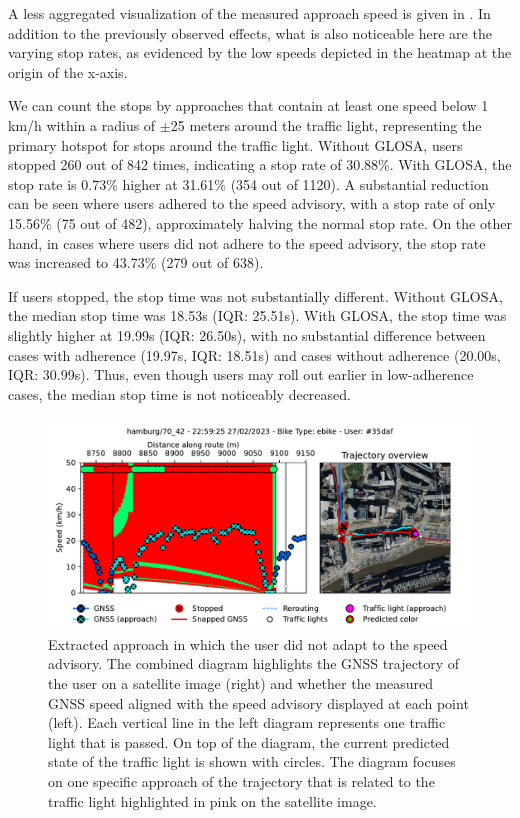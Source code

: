 A less aggregated visualization of the measured approach speed is given in . In addition to the previously observed effects, what is also noticeable here are the varying stop rates, as evidenced by the low speeds depicted in the heatmap at the origin of the x-axis. 

We can count the stops by approaches that contain at least one speed below 1 km/h within a radius of $\pm$25 meters around the traffic light, representing the primary hotspot for stops around the traffic light. Without GLOSA, users stopped 260 out of 842 times, indicating a stop rate of 30.88\%. With GLOSA, the stop rate is 0.73\% higher at 31.61\% (354 out of 1120). A substantial reduction can be seen where users adhered to the speed advisory, with a stop rate of only 15.56\% (75 out of 482), approximately halving the normal stop rate. On the other hand, in cases where users did not adhere to the speed advisory, the stop rate was increased to 43.73\% (279 out of 638).

If users stopped, the stop time was not substantially different. Without GLOSA, the median stop time was 18.53s (IQR: 25.51s). With GLOSA, the stop time was slightly higher at 19.99s (IQR: 26.50s), with no substantial difference between cases with adherence (19.97s, IQR: 18.51s) and cases without adherence (20.00s, IQR: 30.99s). Thus, even though users may roll out earlier in low-adherence cases, the median stop time is not noticeably decreased.

\begin{figure}[t]
\caption{Extracted approach in which the user did not adapt to the speed advisory. The combined diagram highlights the GNSS trajectory of the user on a satellite image (right) and whether the measured GNSS speed aligned with the speed advisory displayed at each point (left). Each vertical line in the left diagram represents one traffic light that is passed. On top of the diagram, the current predicted state of the traffic light is shown with circles. The diagram focuses on one specific approach of the trajectory that is related to the traffic light highlighted in pink on the satellite image.}\label{fig:example-trajectory-not-adapted}
\includegraphics[width=\linewidth]{images/example-trajectory-not-adapted.pdf}
\end{figure}


